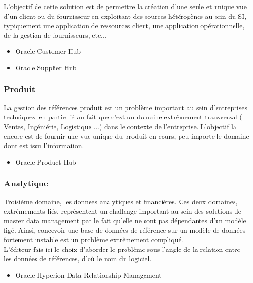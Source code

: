 L'objectif de cette solution est de permettre la création d'une seule et unique vue d'un client ou du fournisseur en exploitant des sources hétérogènes au sein du SI, typiquement une application de ressources client, une application opérationnelle, de la gestion de fournisseurs, etc...\\

\begin{itemize}
\item Oracle Customer Hub
\item Oracle Supplier Hub
\end{itemize}

\subsubsection{Produit}

La gestion des références produit est un problème important au sein d'entreprises techniques, en partie lié au fait que c'est un domaine extrêmement transversal ( Ventes, Ingéniérie, Logistique ...) dans le contexte de l'entreprise. L'objectif la encore est de fournir une vue unique du produit en cours, peu importe le domaine dont est issu l'information.\\

\begin{itemize}
\item Oracle Product Hub
\end{itemize}

\subsubsection{Analytique}

Troisième domaine, les données analytiques et financières. Ces deux domaines, extrêmements liés, représentent un challenge important au sein des solutions de master data management par le fait qu'elle ne sont pas dépendantes d'un modèle figé. Ainsi, concevoir une base de données de référence sur un modèle de données fortement instable est un problème extrêmement compliqué.\\
L'éditeur fais ici le choix d'aborder le problème sous l'angle de la relation entre les données de références, d'où le nom du logiciel.\\

\begin{itemize}
\item  Oracle Hyperion Data Relationship Management
\end{itemize}

